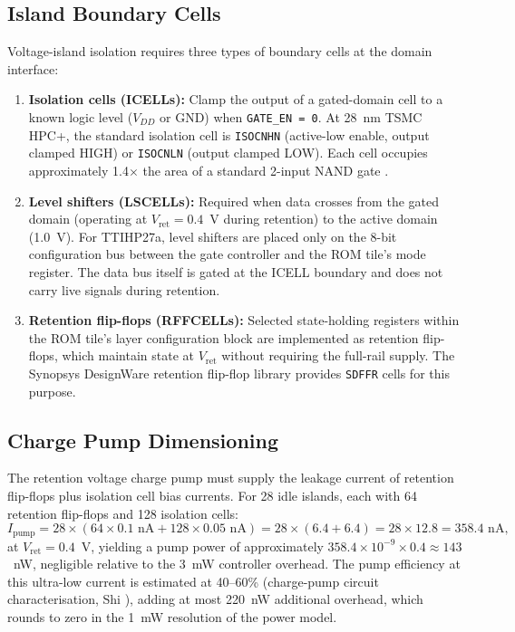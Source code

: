 \subsection{Island Boundary Cells}

Voltage-island isolation requires three types of boundary cells
at the domain interface:

\begin{enumerate}
  \item \textbf{Isolation cells (ICELLs):} Clamp the output of a gated-domain
    cell to a known logic level (\(V_{DD}\) or GND) when \texttt{GATE\_EN = 0}.
    At 28~nm TSMC HPC+, the standard isolation cell is \texttt{ISOCNHN}
    (active-low enable, output clamped HIGH) or \texttt{ISOCNLN}
    (output clamped LOW).  Each cell occupies approximately 1.4\(\times\)
    the area of a standard 2-input NAND gate \cite{chang_power_gating_2006}.

  \item \textbf{Level shifters (LSCELLs):} Required when data crosses from
    the gated domain (operating at \(V_{\mathrm{ret}} = 0.4\)~V during
    retention) to the active domain (1.0~V).  For TTIHP27a, level shifters
    are placed only on the 8-bit configuration bus between the gate
    controller and the ROM tile's mode register.  The data bus itself is
    gated at the ICELL boundary and does not carry live signals during
    retention.

  \item \textbf{Retention flip-flops (RFFCELLs):} Selected state-holding
    registers within the ROM tile's layer configuration block are
    implemented as retention flip-flops, which maintain state at
    \(V_{\mathrm{ret}}\) without requiring the full-rail supply.
    The Synopsys DesignWare retention flip-flop library provides
    \texttt{SDFFR} cells for this purpose.
\end{enumerate}

\subsection{Charge Pump Dimensioning}

The retention voltage charge pump must supply the leakage current
of retention flip-flops plus isolation cell bias currents.  For 28 idle
islands, each with 64 retention flip-flops and 128 isolation cells:
\[
  I_{\mathrm{pump}} = 28 \times (64 \times 0.1\text{ nA} + 128 \times 0.05\text{ nA})
  = 28 \times (6.4 + 6.4) = 28 \times 12.8 = 358.4\text{ nA},
\]
at \(V_{\mathrm{ret}} = 0.4\)~V, yielding a pump power of approximately
\(358.4 \times 10^{-9} \times 0.4 \approx 143\)~nW, negligible relative
to the 3~mW controller overhead.  The pump efficiency at this ultra-low
current is estimated at 40--60\% (charge-pump circuit characterisation,
Shi \cite{shi_voltage_island_2014}), adding at most 220~nW additional
overhead, which rounds to zero in the 1~mW resolution of the power model.

